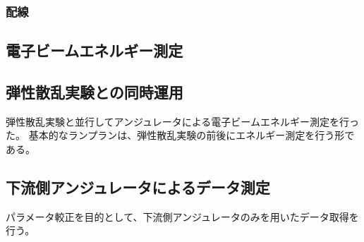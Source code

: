 \documentclass[a4paper,11pt,uplatex]{jsbook}
\begin{document}
\subsubsection{配線}

\subsection{電子ビームエネルギー測定}

\subsection{弾性散乱実験との同時運用}
弾性散乱実験と並行してアンジュレータによる電子ビームエネルギー測定を行った。
基本的なランプランは、弾性散乱実験の前後にエネルギー測定を行う形である。
\subsection{下流側アンジュレータによるデータ測定}
パラメータ較正を目的として、下流側アンジュレータのみを用いたデータ取得を行う。
\end{document}
